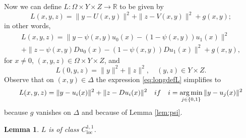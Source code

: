 \documentclass{article}
\newcommand{\R}{\mathbb{R}}
\newtheorem{lemma}[theorem]{Lemma}
\theoremstyle{definition}
\theoremstyle{remark}
\newcommand{\uu}{u}
\begin{document}
Now we can define $L\colon \Omega\times Y\times Z\to\R$ to be given by
\begin{equation}\label{eq:longdefL}
    L(x,y,z)=\|y-U(x,y)\|^2+\|z-V(x,y)\|^2+g(x,y);
\end{equation}
in other words,
\begin{multline*}
 L(x,y,z)=\|y-\psi(x,y)\uu_0(x)-(1-\psi(x,y))\uu_1(x)\|^2\\
 +\|z-\psi(x,y)D\uu_0(x)-(1-\psi(x,y))D\uu_1(x)\|^2+g(x,y),
 \end{multline*}
for $x\neq 0$, $(x,y,z)\in \Omega\times Y\times Z$,
and 
\[L(0,y,z)=\|y\|^2+\|z\|^2,\quad (y,z)\in Y \times Z.\]
Observe that on $(x,y)\in\Delta$ the expression \eqref{eq:longdefL} simplifies to
\begin{equation}\label{eq:defL}
 L(x,y,z)=\|y-\uu_i(x)\|^2+\|z-D\uu_i(x)\|^2\quad \textrm{if}\quad i=\operatornamewithlimits{arg\,min}_{j\in\{0,1\}}\|y-\uu_j(x)\|^2
\end{equation}
because $g$ vanishes on $\Delta$ and because of Lemma \ref{lem:psi}.
%
\begin{lemma}\label{lem:regularityL}
 $L$ is of class $C^{1,1}_{\mathrm{loc}}$.
\end{lemma}
\end{document}
